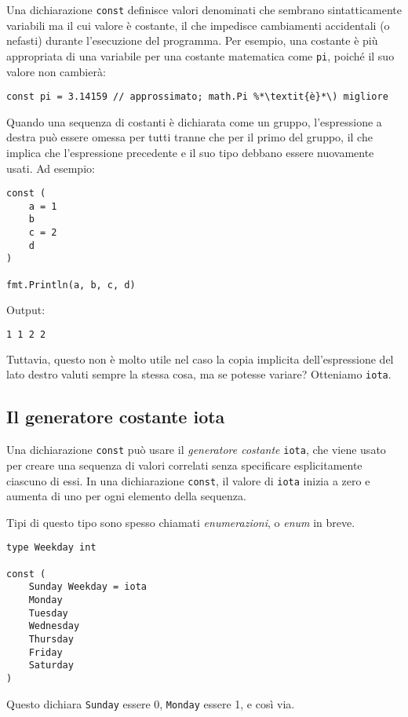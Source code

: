 Una dichiarazione \verb|const| definisce valori denominati che sembrano sintatticamente variabili ma il cui valore è costante, il che impedisce cambiamenti accidentali (o nefasti) durante l'esecuzione del programma.
Per esempio, una costante è più appropriata di una variabile per una costante matematica come \verb|pi|, poiché il suo valore non cambierà:
\begin{lstlisting}[frame = single, label = {lst:lstlisting2-3.1}]
const pi = 3.14159 // approssimato; math.Pi %*\textit{è}*\) migliore
\end{lstlisting}
Quando una sequenza di costanti è dichiarata come un gruppo, l'espressione a destra può essere omessa per tutti tranne che per il primo del gruppo, il che implica che l'espressione precedente e il suo tipo debbano essere nuovamente usati.
Ad esempio:
\begin{lstlisting}[frame = single, label = {lst:lstlisting2-3.2}]
const (
    a = 1
    b
    c = 2
    d
)

fmt.Println(a, b, c, d)
\end{lstlisting}
Output:
\begin{lstlisting}[language = bash, frame = L, label = {lst:lstlisting2-3.3}]
1 1 2 2
\end{lstlisting}
Tuttavia, questo non è molto utile nel caso la copia implicita dell'espressione del lato destro valuti sempre la stessa cosa, ma se potesse variare?
Otteniamo \verb|iota|.

\subsection{Il generatore costante iota}
\label{subsec:il_generatore_costante_iota}%
Una dichiarazione \verb|const| può usare il \textit{generatore costante} \verb|iota|, che viene usato per creare una sequenza di valori correlati senza specificare esplicitamente ciascuno di essi.
In una dichiarazione \verb|const|, il valore di \verb|iota| inizia a zero e aumenta di uno per ogni elemento della sequenza.

Tipi di questo tipo sono spesso chiamati \textit{enumerazioni}, o \textit{enum} in breve.
\begin{lstlisting}[frame = single, label = {lst:lstlisting2-3-1.1}]
type Weekday int

const (
    Sunday Weekday = iota
    Monday
    Tuesday
    Wednesday
    Thursday
    Friday
    Saturday
)
\end{lstlisting}
Questo dichiara \verb|Sunday| essere 0, \verb|Monday| essere 1, e così via.

